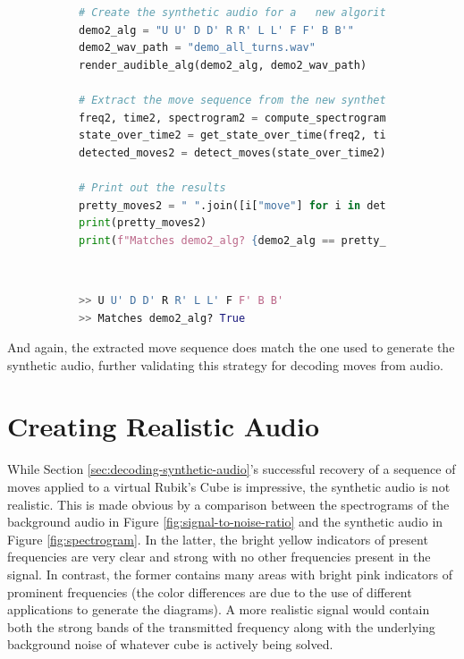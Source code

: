 \begin{figure}[h]
\caption{Full Example: Audio generation and move extraction}
\label{fig:code-synthetic-extraction-demo} 
\begin{subfigure}{\textwidth}
\begin{lstlisting}[language=Python]
# Create the synthetic audio for a   new algorithm
demo2_alg = "U U' D D' R R' L L' F F' B B'"
demo2_wav_path = "demo_all_turns.wav"
render_audible_alg(demo2_alg, demo2_wav_path)

# Extract the move sequence from the new synthetic audio
freq2, time2, spectrogram2 = compute_spectrogram(demo2_wav_path)
state_over_time2 = get_state_over_time(freq2, time2, spectrogram2)
detected_moves2 = detect_moves(state_over_time2)

# Print out the results
pretty_moves2 = " ".join([i["move"] for i in detected_moves2])
print(pretty_moves2)
print(f"Matches demo2_alg? {demo2_alg == pretty_moves2}")
\end{lstlisting}
\end{subfigure}\\

\begin{subfigure}{\textwidth}
\begin{lstlisting}[language=Python, numbers=none]
>> U U' D D' R R' L L' F F' B B'
>> Matches demo2_alg? True
\end{lstlisting}
\end{subfigure}
\end{figure}

And again, the extracted move sequence does match the one used to generate the synthetic audio, further validating this strategy for decoding moves from audio.

\newpage
\section{Creating Realistic Audio}
\label{sec:adding-realistic-noise}
While Section \ref{sec:decoding-synthetic-audio}'s successful recovery of a sequence of moves applied to a virtual Rubik's Cube is impressive, the synthetic audio is not realistic.
This is made obvious by a comparison between the spectrograms of the background audio in Figure \ref{fig:signal-to-noise-ratio} and the synthetic audio in Figure \ref{fig:spectrogram}.
In the latter, the bright yellow indicators of present frequencies are very clear and strong with no other frequencies present in the signal.
In contrast, the former contains many areas with bright pink indicators of prominent frequencies (the color differences are due to the use of different applications to generate the diagrams).
A more realistic signal would contain both the strong bands of the transmitted frequency along with the underlying background noise of whatever cube is actively being solved.

